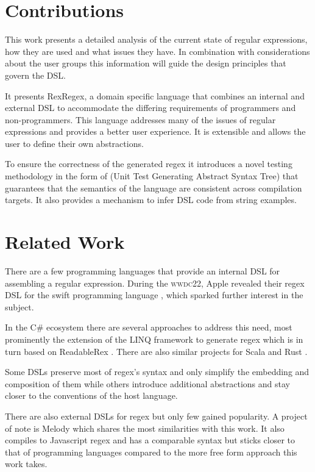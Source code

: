 \section{Contributions}

This work presents a detailed analysis of the current state of regular expressions, how they are used and what issues they have. In combination with considerations about the user groups this information will guide the design principles that govern the DSL. 

It presents RexRegex, a domain specific language that combines an internal and external DSL to accommodate the differing requirements of programmers and non-programmers. This language addresses many of the issues of regular expressions and provides a better user experience. It is extensible and allows the user to define their own abstractions.

To ensure the correctness of the generated regex it introduces a novel testing methodology in the form of \utgast{} (Unit Test Generating Abstract Syntax Tree) that guarantees that the semantics of the language are consistent across compilation targets. It also provides a mechanism to infer DSL code from string examples.

\section{Related Work} \label{sec:relatedWork}

There are a few programming languages that provide an internal DSL for assembling a regular expression. During the \textsc{wwdc22}, Apple revealed their regex DSL for the swift programming language \cite{RegexDslSwift}, which sparked further interest in the subject.

In the C\# ecosystem there are several approaches to address this need, most prominently the extension of the LINQ framework \cite{linq} to generate regex \cite{RegexDslLinq} which is in turn based on ReadableRex \cite{RegexDslReadableRex}. There are also similar projects for Scala \cite{RegexDslRel} and Rust \cite{RegexDslPomsky}. 

Some DSLs preserve most of regex's syntax and only simplify the embedding and composition of them while others introduce additional abstractions and stay closer to the conventions of the host language.

There are also external DSLs for regex but only few gained popularity. A project of note is Melody \cite{RegexDslMelody} which shares the most similarities with this work. It also compiles to Javascript regex and has a comparable syntax but sticks closer to that of programming languages compared to the more free form approach this work takes.

